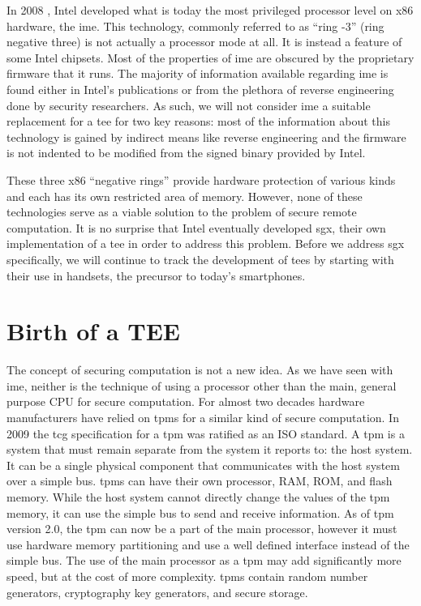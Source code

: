 In 2008 \cite{eldar2008configuring}, Intel developed what is today the most privileged processor level on x86 hardware, the \gls{ime}. This technology, commonly referred to as ``ring -3'' (ring negative three) is not actually a processor mode at all. It is instead a feature of some Intel chipsets. Most of the properties of \gls{ime} are obscured by the proprietary firmware that it runs. The majority of information available regarding \gls{ime} is found either in Intel's publications or from the plethora of reverse engineering done by security researchers. As such, we will not consider \gls{ime} a suitable replacement for a \gls{tee} for two key reasons: most of the information about this technology is gained by indirect means like reverse engineering and the firmware is not indented to be modified from the signed binary provided by Intel. 

These three x86 ``negative rings'' provide hardware protection of various kinds and each has its own restricted area of memory. However, none of these technologies serve as a viable solution to the problem of secure remote computation. It is no surprise that Intel eventually developed \gls{sgx}, their own implementation of a \gls{tee} in order to address this problem. Before we address \gls{sgx} specifically, we will continue to track the development of \glspl{tee} by starting with their use in handsets, the precursor to today's smartphones.

\section{Birth of a TEE}

The concept of securing computation is not a new idea. As we have seen with \gls{ime}, neither is the technique of using a processor other than the main, general purpose CPU for secure computation. For almost two decades \cite{osborn2013trusted} hardware manufacturers have relied on \glspl{tpm} for a similar kind of secure computation. In 2009 the \gls{tcg} specification for a \gls{tpm} was ratified as an ISO standard. A \gls{tpm} is a system that must remain separate from the system it reports to: the host system. It can be a single physical component that communicates with the host system over a simple bus. \glspl{tpm} can have their own processor, RAM, ROM, and flash memory. While the host system cannot directly change the values of the \gls{tpm} memory, it can use the simple bus to send and receive information. As of \gls{tpm} version 2.0, the \gls{tpm} can now be a part of the main processor, however it must use hardware memory partitioning and use a well defined interface instead of the simple bus. The use of the main processor as a \gls{tpm} may add significantly more speed, but at the cost of more complexity. \glspl{tpm} contain random number generators, cryptography key generators, and secure storage.

